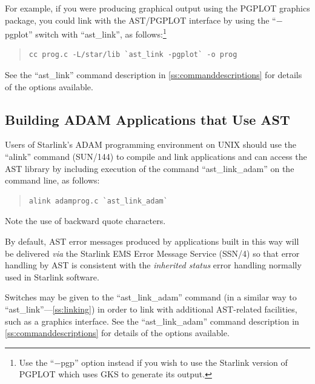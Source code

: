 \documentclass[twoside,11pt]{article}
\newcommand{\htmlref}[2]{#1}
\newcommand{\xref}[3]{#1}
\newcommand{\appref}[1]{Appendix~\ref{#1}}
\newcommand{\secref}[1]{\S\ref{#1}}
\renewcommand{\appref}[1]{\ref{#1}}
\renewcommand{\secref}[1]{\ref{#1}}
\begin{document}
For example, if you were producing graphical output using the PGPLOT
graphics package, you could link with the AST/PGPLOT interface by
using the ``$-$pgplot'' switch with ``ast\_link'', as
follows:\footnote{Use the ``$-$pgp'' option instead if you wish to use
the Starlink version of PGPLOT which uses GKS to generate its output.}

\begin{quote}
\small
\begin{verbatim}
cc prog.c -L/star/lib `ast_link -pgplot` -o prog
\end{verbatim}
\normalsize
\end{quote}

See the ``ast\_link'' command description in
\appref{ss:commanddescriptions} for details of the options available.

\subsection{Building ADAM Applications that Use AST}

Users of Starlink's \xref{ADAM}{sg4}{} programming environment
 on UNIX should use the
``\xref{alink}{sun144}{ADAM_link_scripts}'' command
(\xref{SUN/144}{sun144}{}) to compile and link applications and can
access the AST library by including execution of the command
``\htmlref{ast\_link\_adam}{ast_link_adam}'' on the command line, as follows:

\begin{quote}
\small
\begin{verbatim}
alink adamprog.c `ast_link_adam`
\end{verbatim}
\normalsize
\end{quote}

Note the use of backward quote characters.

By default, AST error messages produced by applications built in this
way will be delivered {\em{via}} the Starlink EMS Error Message
Service (\xref{SSN/4}{ssn4}{}) so that error handling by AST is
consistent with the \xref{{\em{inherited
status}}}{sun104}{inherited_status} error handling normally used in
Starlink software.

Switches may be given to the ``ast\_link\_adam'' command (in a similar
way to ``\htmlref{ast\_link}{ast_link}''---\secref{ss:linking}) in order to link with
additional AST-related facilities, such as a graphics interface. See
the ``ast\_link\_adam'' command description in
\appref{ss:commanddescriptions} for details of the options available.
\end{document}
